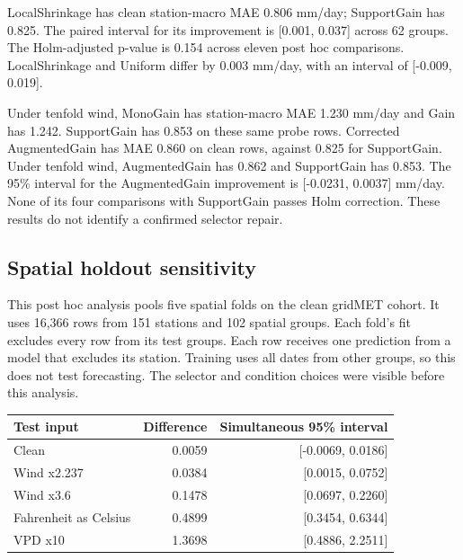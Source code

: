 \documentclass[10pt,letterpaper]{article}
\begin{document}
LocalShrinkage has clean station-macro MAE 0.806 mm/day; SupportGain has 0.825.
The paired interval for its improvement is [0.001, 0.037] across 62 groups.
The Holm-adjusted p-value is 0.154 across eleven post hoc comparisons.
LocalShrinkage and Uniform differ by 0.003 mm/day, with an interval of [-0.009, 0.019].

Under tenfold wind, MonoGain has station-macro MAE 1.230 mm/day and Gain has 1.242.
SupportGain has 0.853 on these same probe rows.
Corrected AugmentedGain has MAE 0.860 on clean rows, against 0.825 for SupportGain.
Under tenfold wind, AugmentedGain has 0.862 and SupportGain has 0.853.
The 95\% interval for the AugmentedGain improvement is [-0.0231, 0.0037] mm/day.
None of its four comparisons with SupportGain passes Holm correction.
These results do not identify a confirmed selector repair.

\subsection{Spatial holdout sensitivity}\label{app:spatial-holdout}
This post hoc analysis pools five spatial folds on the clean gridMET cohort.
It uses 16,366 rows from 151 stations and 102 spatial groups.
Each fold's fit excludes every row from its test groups.
Each row receives one prediction from a model that excludes its station.
Training uses all dates from other groups, so this does not test forecasting.
The selector and condition choices were visible before this analysis.

\begin{center}
\begin{minipage}{.96\textwidth}
\centering
\small
\setlength{\tabcolsep}{3pt}
\captionsetup{width=\linewidth}
\label{tab:spatial-holdout}
\begin{tabularx}{\linewidth}{@{}Xrr@{}}
\toprule
Test input & Difference & Simultaneous 95\% interval \\
\midrule
Clean & 0.0059 & [-0.0069, 0.0186] \\
Wind x2.237 & 0.0384 & [0.0015, 0.0752] \\
Wind x3.6 & 0.1478 & [0.0697, 0.2260] \\
Fahrenheit as Celsius & 0.4899 & [0.3454, 0.6344] \\
VPD x10 & 1.3698 & [0.4886, 2.2511] \\
\bottomrule
\end{tabularx}
\end{minipage}
\end{center}
\end{document}
